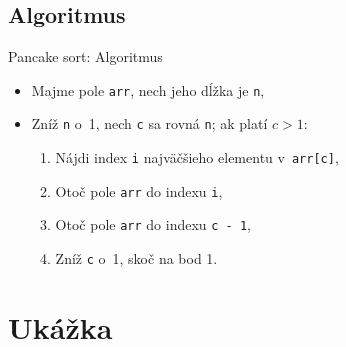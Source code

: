 \documentclass[10pt, hyperref={unicode}, compress]{beamer}
\begin{document}
        \subsection{Algoritmus}
            \begin{frame}{Pancake sort: Algoritmus}
                \begin{itemize}
                    \item Majme pole \texttt{arr}, nech jeho dĺžka je \texttt{n},
                    \item Zníž \texttt{n} o~1, nech \texttt{c} sa rovná \texttt{n}; ak platí $c > 1$:
                    \begin{enumerate}
                        \item Nájdi index \texttt{i} najväčšieho elementu v~\texttt{arr[c]},
                        \item Otoč pole \texttt{arr} do indexu \texttt{i},
                        \item Otoč pole \texttt{arr} do indexu \texttt{c - 1},
                        \item Zníž \texttt{c} o~1, skoč na bod 1.
                    \end{enumerate}
                \end{itemize}
            \end{frame}

    \section{Ukážka}
\end{document}
